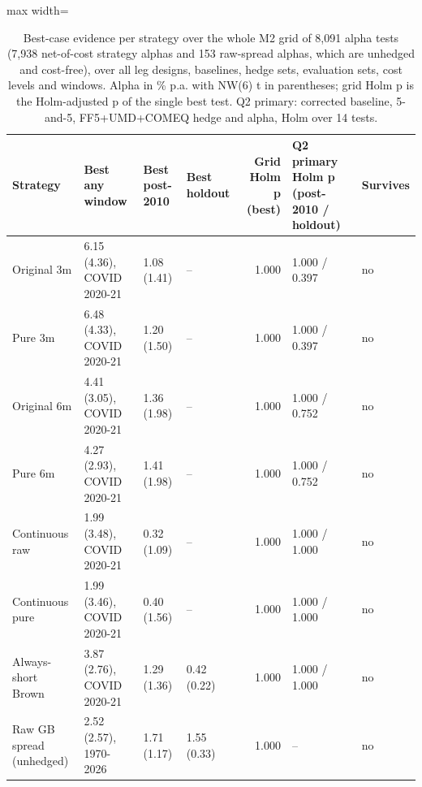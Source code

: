 \begin{table}[H]
\centering\small
\caption{Best-case evidence per strategy over the whole M2 grid of 8,091 alpha tests (7,938 net-of-cost strategy alphas and 153 raw-spread alphas, which are unhedged and cost-free), over all leg designs, baselines, hedge sets, evaluation sets, cost levels and windows. Alpha in \% p.a. with NW(6) t in parentheses; grid Holm p is the Holm-adjusted p of the single best test. Q2 primary: corrected baseline, 5-and-5, FF5+UMD+COMEQ hedge and alpha, Holm over 14 tests.}
\label{tab:m2_summary}
\begin{adjustbox}{max width=\linewidth}
\begin{tabular}{llllrll}
\toprule
Strategy & Best any window & Best post-2010 & Best holdout & Grid Holm p (best) & Q2 primary Holm p (post-2010 / holdout) & Survives \\
\midrule
Original 3m & 6.15 (4.36), COVID 2020-21 & 1.08 (1.41) & -- & 1.000 & 1.000 / 0.397 & no \\
Pure 3m & 6.48 (4.33), COVID 2020-21 & 1.20 (1.50) & -- & 1.000 & 1.000 / 0.397 & no \\
Original 6m & 4.41 (3.05), COVID 2020-21 & 1.36 (1.98) & -- & 1.000 & 1.000 / 0.752 & no \\
Pure 6m & 4.27 (2.93), COVID 2020-21 & 1.41 (1.98) & -- & 1.000 & 1.000 / 0.752 & no \\
Continuous raw & 1.99 (3.48), COVID 2020-21 & 0.32 (1.09) & -- & 1.000 & 1.000 / 1.000 & no \\
Continuous pure & 1.99 (3.46), COVID 2020-21 & 0.40 (1.56) & -- & 1.000 & 1.000 / 1.000 & no \\
Always-short Brown & 3.87 (2.76), COVID 2020-21 & 1.29 (1.36) & 0.42 (0.22) & 1.000 & 1.000 / 1.000 & no \\
Raw GB spread (unhedged) & 2.52 (2.57), 1970-2026 & 1.71 (1.17) & 1.55 (0.33) & 1.000 & -- & no \\
\bottomrule
\end{tabular}
\end{adjustbox}
\end{table}
